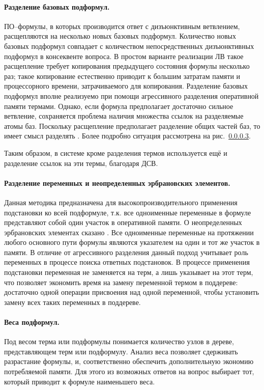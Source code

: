 \paragraph{Разделение базовых подформул.} ПО--формулы, в которых производится ответ  с дизъюнктивным ветвлением, расщепляются на несколько новых базовых подформул. Количество новых базовых подформул совпадает с количеством непосредственных дизъюнктивных подформул в консеквенте вопроса. В простом варианте реализации ЛВ такое расщепление требует копирования предыдущего состояния формулы несколько раз; такое копирование естественно приводит к большим затратам памяти и процессорного времени, затрачиваемого для копирования. Разделение базовых подформул вполне реализуемо при помощи агрессивного разделения оперативной памяти термами. Однако, если формула предполагает достаточно сильное ветвление, сохраняется проблема наличия множества ссылок на разделяемые атомы баз. Поскольку расщепление предполагает разделение общих частей баз, то имеет смысл разделять . Более подробно ситуация рассмотрена на рис.~\ref{}.

Таким образом, в системе кроме разделения термов используется ещё и разделение ссылок на эти термы, благодаря ДСВ. 

\paragraph{Разделение переменных и неопределенных эрбрановских элементов.} Данная методика предназначена для высокопроизводительного применения подстановки ко всей подформуле, т.к. все одноименные переменные в формуле представляют собой один участок в оперативной памяти. О неопределенных эрбрановских элементах сказано . Все одноименные переменные на протяжении любого основного пути формулы \cite{dissChe} являются указателем на один и тот же участок в памяти. В отличие от агрессивного разделения данный подход учитывает роль переменных в процессе поиска ответных подстановок. В процессе применения подстановки переменная не заменяется на терм, а лишь указывает на этот терм, что позволяет экономить время на замену переменной термом в поддереве: достаточно одной операции присвоения над одной переменной, чтобы установить замену всех таких переменных в поддереве.

\paragraph{Веса подформул.} Под весом терма или подформулы понимается количество узлов в дереве, представляющем терм или подформулу. Анализ веса позволяет сдерживать разрастание формулы, и, соответственно обеспечить дополнительную экономию потребляемой памяти. Для этого из возможных ответов на вопрос выбирает  тот, который приводит к формуле наименьшего веса.

